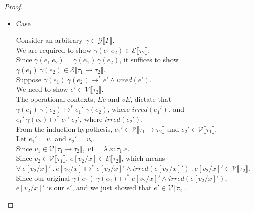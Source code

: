 \documentclass{article}
\begin{document}
\begin{proof}
\begin{itemize}
\begin{itemize}
\item Case \begin{mathpar}  \end{mathpar}
  Consider an arbitrary $\gamma \in \mathcal{G} \llbracket \Gamma \rrbracket$.\\
  We are required to show $\gamma(e_1~e_2) \in \mathcal{E} \llbracket \tau_2 \rrbracket$.\\
  Since $\gamma(e_1~e_2) = \gamma(e_1)~\gamma(e_2)$, it suffices to show $\gamma(e_1)~\gamma(e_2) \in \mathcal{E} \llbracket \tau_1 \rightarrow \tau_2 \rrbracket$.\\
  Suppose $\gamma(e_1)~\gamma(e_2) \mapsto^* e' \wedge irred(e')$.\\
  We need to show $e' \in \mathcal{V} \llbracket \tau_2 \rrbracket$.\\
  The operational contexts, $E e$ and $v E$, dictate that\\
  $\gamma(e_1)~\gamma(e_2) \mapsto^* e_1'~\gamma(e_2)$, where $irred(e_1')$, and\\
  $e_1'~\gamma(e_2) \mapsto^* e_1'~e_2'$, where $irred(e_2')$.\\
  From the induction hypothesis, $e_1' \in \mathcal{V} \llbracket \tau_1 \rightarrow \tau_2 \rrbracket$ and $e_2' \in \mathcal{V} \llbracket \tau_1 \rrbracket$.\\
  Let $e_1' = v_1$ and $e_2' = v_2$.\\
  Since $v_1 \in \mathcal{V} \llbracket \tau_1 \rightarrow \tau_2 \rrbracket$, $v1 = \lambda~x:\tau_1.e$.\\
  Since $v_2 \in \mathcal{V} \llbracket \tau_1 \rrbracket$, $e[v_2/x] \in \mathcal{E} \llbracket \tau_2 \rrbracket$, which means\\
  $\forall~e[v_2/x]'~.~e[v_2/x] \mapsto^* e[v_2/x]' \wedge irred(e[v_2/x]')~.~ e[v_2/x]' \in \mathcal{V} \llbracket \tau_2 \rrbracket$.\\
  Since our original $\gamma(e_1)~\gamma(e_2) \mapsto^* e[v_2/x]' \wedge irred(e[v_2/x]')$, $e[v_2/x]'$ is our $e'$, and we just showed that $e' \in \mathcal{V} \llbracket \tau_2 \rrbracket$.\\

\newpage      


\end{itemize}
\end{itemize}
\end{proof}
\end{document}
